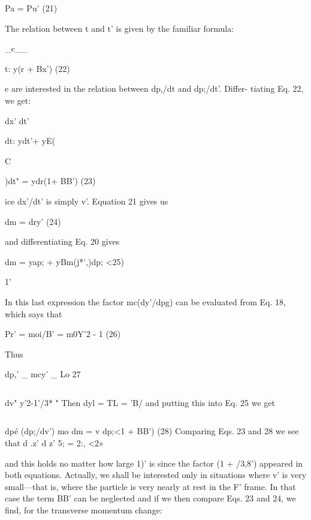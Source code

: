 Pa = Pu' (21)
\begin{equation}
\end{equation}

The relation between t and t' is given by the familiar formula:

_c__

t: y(r + Bx') (22)
\begin{equation}
\end{equation}

e are interested in the relation between dp,/dt and dp;/dt'. Differ-
tiating Eq. 22, we get:

dx'
dt'

dt: ydt'+ yE(

C

)dt" = ydr(1+ BB') (23)
\begin{equation}
\end{equation}

ice dx'/dt' is simply v'. Equation 21 gives us

dm = dry' (24)
\begin{equation}
\end{equation}

and differentiating Eq. 20 gives

dm = yap; + yBm(j*',)dp; <25)
\begin{equation}
\end{equation}

1'

In this last expression the factor mc(dy'/dpg) can be evaluated from
Eq. 18, which says that

Pr' = moi/B' = m0\/Y'2 - 1 (26)
\begin{equation}
\end{equation}

Thus

dp,' _ mcy' _ Lo 27

\begin{equation}
\end{equation}

dv" y'2-1'/3* "
Then dyl = TL = 'B/ and putting this into Eq. 25 we get

\begin{equation}
\end{equation}


dpé (dp;/dv') mo
dm = v dp;<1 + BB') (28)
Comparing Eqs. 23 and 28 we see that
d .z' d z'
5; = 2:, <2»

and this holds no matter how large 1)' is since the factor (1 + /3,8')
appeared in both equations. Actually, we shall be interested only in
situations where v' is very small---that is, where the particle is very
nearly at rest in the F' frame. In that case the term BB' can be neglected
and if we then compare Eqs. 23 and 24, we find, for the transverse
momentum change:

